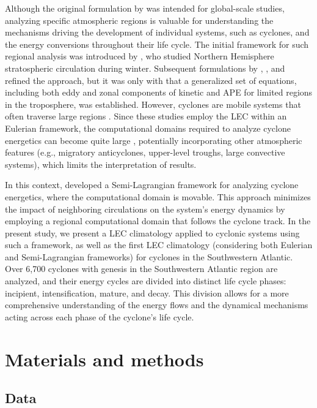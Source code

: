 \documentclass[pdflatex,sn-chicago]{sn-jnl}%
\theoremstyle{plain}
\theoremstyle{definition}
\theoremstyle{remark}
\theoremstyle{definition}
\begin{document}
Although the original formulation by \citet{lorenz1967nature} was intended for global-scale studies, analyzing specific atmospheric regions is valuable for understanding the mechanisms driving the development of individual systems, such as cyclones, and the energy conversions throughout their life cycle. The initial framework for such regional analysis was introduced by \citet{muench1965dynamics}, who studied Northern Hemisphere stratospheric circulation during winter. Subsequent formulations by \citet{dutton1967theory}, \citet{vincent1973some}, and \citet{smith1980energetics} refined the approach, but it was only with \citet{brennan1980zonal} that a generalized set of equations, including both eddy and zonal components of kinetic and APE for limited regions in the troposphere, was established. However, cyclones are mobile systems that often traverse large regions \citep[e.g.]{hoskins2002new,couto2024new}. Since these studies employ the LEC within an Eulerian framework, the computational domains required to analyze cyclone energetics can become quite large \citep[e.g.]{black2013universal}, potentially incorporating other atmospheric features (e.g., migratory anticyclones, upper-level troughs, large convective systems), which limits the interpretation of results.

In this context, \citet{michaelides1999quasi} developed a Semi-Lagrangian framework for analyzing cyclone energetics, where the computational domain is movable. This approach minimizes the impact of neighboring circulations on the system's energy dynamics by employing a regional computational domain that follows the cyclone track. In the present study, we present a LEC climatology applied to cyclonic systems using such a framework, as well as the first LEC climatology (considering both Eulerian and Semi-Lagrangian frameworks) for cyclones in the Southwestern Atlantic. Over 6,700 cyclones with genesis in the Southwestern Atlantic region are analyzed, and their energy cycles are divided into distinct life cycle phases: incipient, intensification, mature, and decay. This division allows for a more comprehensive understanding of the energy flows and the dynamical mechanisms acting across each phase of the cyclone's life cycle.

\section{Materials and methods}

\subsection{Data}\label{sec:data}
\end{document}
